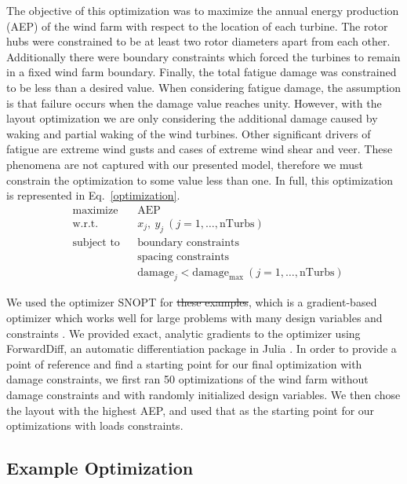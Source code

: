 \documentclass[11pt,letterpaper]{article}
\providecommand{\DIFadd}[1]{{\protect\color{blue}\uwave{#1}}} %
\providecommand{\DIFdel}[1]{{\protect\color{red}\sout{#1}}}                      %
\providecommand{\DIFaddbegin}{} %
\providecommand{\DIFaddend}{} %
\providecommand{\DIFdelbegin}{} %
\providecommand{\DIFdelend}{} %
\newcommand{\DIFscaledelfig}{0.5}
\newlength{\DIFdelgraphicswidth} %
\newlength{\DIFdelgraphicsheight} %
\newcommand{\DIFaddincludegraphics}[2][]{{\color{blue}\fbox{\DIFOincludegraphics[#1]{#2}}}} %
\newcommand{\DIFdelincludegraphics}[2][]{%
\sbox{\DIFdelgraphicsbox}{\DIFOincludegraphics[#1]{#2}}%
\settoboxwidth{\DIFdelgraphicswidth}{\DIFdelgraphicsbox} %
\settoboxtotalheight{\DIFdelgraphicsheight}{\DIFdelgraphicsbox} %
\scalebox{\DIFscaledelfig}{%
\parbox[b]{\DIFdelgraphicswidth}{\usebox{\DIFdelgraphicsbox}\\[-\baselineskip] \rule{\DIFdelgraphicswidth}{0em}}\llap{\resizebox{\DIFdelgraphicswidth}{\DIFdelgraphicsheight}{%
\setlength{\unitlength}{\DIFdelgraphicswidth}%
\begin{picture}(1,1)%
\thicklines\linethickness{2pt} %
{\color[rgb]{1,0,0}\put(0,0){\framebox(1,1){}}}%
{\color[rgb]{1,0,0}\put(0,0){\line( 1,1){1}}}%
{\color[rgb]{1,0,0}\put(0,1){\line(1,-1){1}}}%
\end{picture}%
}\hspace*{3pt}}} %
} %
\DeclareRobustCommand{\DIFaddbegin}{\DIFOaddbegin \let\includegraphics\DIFaddincludegraphics} %
\DeclareRobustCommand{\DIFaddend}{\DIFOaddend \let\includegraphics\DIFOincludegraphics} %
\DeclareRobustCommand{\DIFdelbegin}{\DIFOdelbegin \let\includegraphics\DIFdelincludegraphics} %
\DeclareRobustCommand{\DIFdelend}{\DIFOaddend \let\includegraphics\DIFOincludegraphics} %
\begin{document}
The objective of this optimization was to maximize the annual energy production (AEP) of the wind farm with respect to the location of each turbine. The rotor hubs were constrained to be at least two rotor diameters apart from each other. Additionally there were boundary constraints which forced the turbines to remain in a fixed wind farm boundary. Finally, the total fatigue damage was constrained to be less than a desired value. When considering fatigue damage, the assumption is that failure occurs when the damage value reaches unity. However, with the layout optimization we are only considering the additional damage caused by waking and partial waking of the wind turbines. Other significant drivers of fatigue are extreme wind gusts and cases of extreme wind shear and veer. These phenomena are not captured with our presented model, therefore we must constrain the optimization to some value less than one. In full, this optimization is represented in Eq.~\ref{optimization}.
% 
\begin{equation}
			\begin{aligned}
				& \text{maximize}
					& & \text{AEP} \\
                & \text{w.r.t.} 
                	&& x_j,~ y_j ~ (j = 1, \ldots, \text{nTurbs})\\
				& \text{subject to}
					& & \text{boundary constraints} \\
						&&& \text{spacing constraints} \\
						&&& \text{damage}_j < \text{damage}_\text{max} ~ (j = 1, \ldots, \text{nTurbs})
			\end{aligned}
		\label{optimization}
		\end{equation}

We used the optimizer SNOPT for \DIFdelbegin \DIFdel{these examples}\DIFdelend \DIFaddbegin \DIFadd{this example}\DIFaddend , which is a gradient-based optimizer which works well for large problems with many design variables and constraints \cite{gill2005snopt}. We provided exact, analytic gradients to the optimizer using ForwardDiff, an automatic differentiation package in Julia \cite{revels2016forward}.
In order to provide a point of reference and find a starting point for our final optimization with damage constraints, we first ran 50 optimizations of the wind farm without damage constraints and with randomly initialized design variables. We then chose the layout with the highest AEP, and used that as the starting point for our optimizations with loads constraints.


\DIFdelbegin %
\DIFdelend \DIFaddbegin \subsection{Example Optimization}
\DIFaddend 
\end{document}
